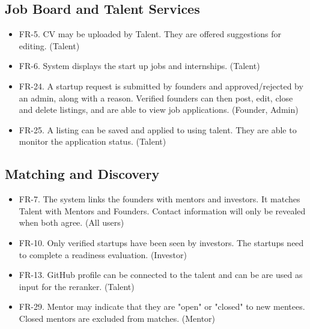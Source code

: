 \documentclass{FastFyp}
\begin{document}
\subsection{Job Board and Talent Services}
\begin{itemize}
\item FR-5. CV may be uploaded by Talent. They are offered suggestions for editing. (Talent)
\item FR-6. System displays the start up jobs and internships. (Talent)
\item FR-24. A startup request is submitted by founders and approved/rejected by an admin, along with a reason. Verified founders can then post, edit, close and delete listings, and are able to view job applications. (Founder, Admin)
\item FR-25. A listing can be saved and applied to using talent. They are able to monitor the application status. (Talent)
\end{itemize}

\subsection{Matching and Discovery}
\begin{itemize}
\item FR-7. The system links the founders with mentors and investors. It matches Talent with Mentors and Founders. Contact information will only be revealed when both agree. (All users)
\item FR-10. Only verified startups have been seen by investors. The startups need to complete a readiness evaluation. (Investor)
\item FR-13. GitHub profile can be connected to the talent and can be are used as input for the reranker. (Talent)
\item FR-29. Mentor may indicate that they are "open" or "closed" to new mentees. Closed mentors are excluded from matches. (Mentor)
\end{itemize}
\end{document}
